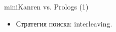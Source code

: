 \documentclass[10pt, mathserif]{beamer}
\let\\\tabularnewline
\let\\\tabularnewline
\newcommand{\inml}[1]{\mbox{\lstinline{#1}}}
\theoremstyle{definition}
\begin{document}
% 
% 

\begin{frame}[fragile]{miniKanren vs. Prologs (1)}
\begin{itemize}
  \item Стратегия поиска: interleaving.
\end{itemize}
\end{frame}
\end{document}
